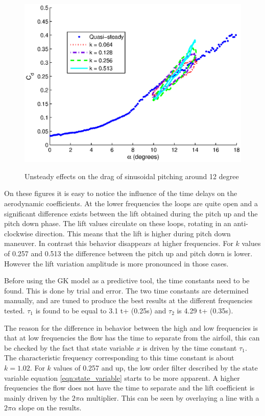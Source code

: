 \begin{figure}[h]
  \begin{center}
    \scalebox{0.9}  
    {\includegraphics{./Figures/Pitching_allcases_CD_12_amp_2.eps}}
  \end{center}
  \caption{Unsteady effects on the drag of sinusoidal pitching around 12 degree} 
  \label{fig:Pitching_allcases_Cd_12}
\end{figure}

\FloatBarrier

\par On these figures it is easy to notice the influence of the time delays on the aerodynamic coefficients.
At the lower frequencies the loops are quite open and a significant difference exists between the lift obtained during the pitch up and the pitch down phase.
The lift values circulate on these loops, rotating in an anti-clockwise direction.
This means that the lift is higher during pitch down maneuver.
In contrast this behavior disappears at higher frequencies.
For $k$ values of 0.257 and 0.513 the difference between the pitch up and pitch down is lower.
However the lift variation amplitude is more pronounced in those cases.

\par Before using the GK model as a predictive tool, the time constants need to be found.
This is done by trial and error.
The two time constants are determined manually, and are tuned to produce the best results at the different frequencies tested.
$\tau_1$ is found to be equal to 3.1 t+ (0.25s) and $\tau_2$ is 4.29 t+ (0.35s).


\par The reason for the difference in behavior between the high and low frequencies is that at low frequencies the flow has the time to separate from the airfoil, this can be checked by the fact that state variable $x$ is driven by the time constant $\tau_1$.
The characteristic frequency corresponding to this time constant is about $k=1.02$.
For $k$ values of 0.257 and up, the low order filter described by the state variable equation \ref{eqn:state_variable} starts to be more apparent.
A higher frequencies the flow does not have the time to separate and the lift coefficient is mainly driven by the $2\pi\alpha$ multiplier.
This can be seen by overlaying a line with a $2\pi\alpha$ slope on the results.

